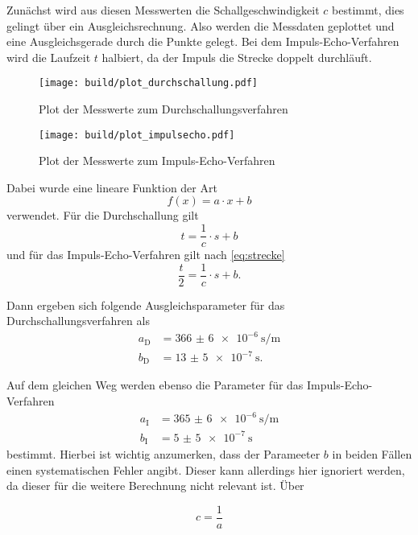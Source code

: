 Zunächst wird aus diesen Messwerten die Schallgeschwindigkeit $c$ bestimmt, dies gelingt über ein Ausgleichsrechnung.
Also werden die Messdaten geplottet und eine Ausgleichsgerade durch die Punkte gelegt.
Bei dem Impuls-Echo-Verfahren wird die Laufzeit $t$ halbiert, da der Impuls die Strecke doppelt durchläuft.

\begin{figure}
    \centering
    \texttt{[image: build/plot\_durchschallung.pdf]}
    \caption{Plot der Messwerte zum Durchschallungsverfahren}
    \label{fig:durch}
\end{figure}

\begin{figure}
    \centering
    \texttt{[image: build/plot\_impulsecho.pdf]}
    \caption{Plot der Messwerte zum Impuls-Echo-Verfahren}
    \label{fig:impuls}
\end{figure}

Dabei wurde eine lineare Funktion der Art 
\begin{equation}
    f(x) = a \cdot x + b 
\end{equation}
verwendet.
Für die Durchschallung gilt
\begin{equation}
    t = \frac{1}{c} \cdot s + b 
\end{equation}
und für das Impuls-Echo-Verfahren gilt nach \eqref{eq:strecke}
\begin{equation}
    \frac{t}{2} = \frac{1}{c} \cdot s + b.
\end{equation}

Dann ergeben sich folgende Ausgleichsparameter für das Durchschallungsverfahren als
\begin{align}
    a_\text{D} &= \SI{366(6)e-6}{\second\per\meter}\\
    b_\text{D} &= \SI{13(5)e-7}{\second}.
\end{align}

Auf dem gleichen Weg werden ebenso die Parameter für das Impuls-Echo-Verfahren 
\begin{align}
    a_\text{I} &= \SI{365(6)e-6}{\second\per\meter}\\
    b_\text{I} &= \SI{5(5)e-7}{\second}
\end{align}
bestimmt.
Hierbei ist wichtig anzumerken, dass der Parameeter $b$ in beiden Fällen einen systematischen Fehler angibt.
Dieser kann allerdings hier ignoriert werden, da dieser für die weitere Berechnung nicht relevant ist.
Über 

\begin{equation}
    c = \frac{1}{a}
\end{equation}

